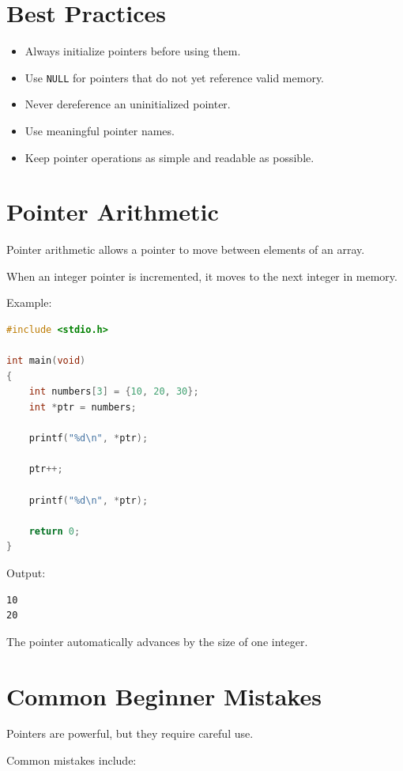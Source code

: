 \documentclass[12pt,openany]{book}
\begin{document}
\section{Best Practices}

\begin{itemize}
    \item Always initialize pointers before using them.
    \item Use \texttt{NULL} for pointers that do not yet reference valid memory.
    \item Never dereference an uninitialized pointer.
    \item Use meaningful pointer names.
    \item Keep pointer operations as simple and readable as possible.
\end{itemize}
\section{Pointer Arithmetic}

Pointer arithmetic allows a pointer to move between elements of an array.

When an integer pointer is incremented, it moves to the next integer in memory.

Example:

\begin{lstlisting}[language=C]
#include <stdio.h>

int main(void)
{
    int numbers[3] = {10, 20, 30};
    int *ptr = numbers;

    printf("%d\n", *ptr);

    ptr++;

    printf("%d\n", *ptr);

    return 0;
}
\end{lstlisting}

Output:

\begin{lstlisting}
10
20
\end{lstlisting}

The pointer automatically advances by the size of one integer.

\section{Common Beginner Mistakes}

Pointers are powerful, but they require careful use.

Common mistakes include:
\end{document}
